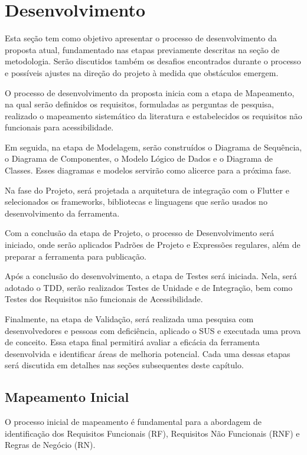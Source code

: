 \chapter{Desenvolvimento}

Esta seção tem como objetivo apresentar o processo de desenvolvimento da proposta atual, fundamentado nas etapas previamente descritas na seção de metodologia. Serão discutidos também os desafios encontrados durante o processo e possíveis ajustes na direção do projeto à medida que obstáculos emergem.

O processo de desenvolvimento da proposta inicia com a etapa de Mapeamento, na qual serão definidos os requisitos, formuladas as perguntas de pesquisa, realizado o mapeamento sistemático da literatura e estabelecidos os requisitos não funcionais para acessibilidade.

Em seguida, na etapa de Modelagem, serão construídos o Diagrama de Sequência, o Diagrama de Componentes, o Modelo Lógico de Dados e o Diagrama de Classes. Esses diagramas e modelos servirão como alicerce para a próxima fase.

Na fase do Projeto, será projetada a arquitetura de integração com o Flutter e selecionados os frameworks, bibliotecas e linguagens que serão usados no desenvolvimento da ferramenta.

Com a conclusão da etapa de Projeto, o processo de Desenvolvimento será iniciado, onde serão aplicados Padrões de Projeto e Expressões regulares, além de preparar a ferramenta para publicação.

Após a conclusão do desenvolvimento, a etapa de Testes será iniciada. Nela, será adotado o TDD, serão realizados Testes de Unidade e de Integração, bem como Testes dos Requisitos não funcionais de Acessibilidade.

Finalmente, na etapa de Validação, será realizada uma pesquisa com desenvolvedores e pessoas com deficiência, aplicado o SUS e executada uma prova de conceito. Essa etapa final permitirá avaliar a eficácia da ferramenta desenvolvida e identificar áreas de melhoria potencial. Cada uma dessas etapas será discutida em detalhes nas seções subsequentes deste capítulo.

\section{Mapeamento Inicial}

O processo inicial de mapeamento é fundamental para a abordagem de identificação dos Requisitos Funcionais (RF), Requisitos Não Funcionais (RNF) e Regras de Negócio (RN).

